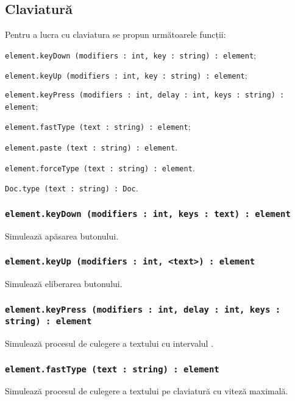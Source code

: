 \subsection{Claviatură}

Pentru a lucra cu claviatura se propun următoarele funcții:
\begin{icItems}
	\item \lstinline|element.keyDown (modifiers : int, key : string) : element|;
	\item \lstinline|element.keyUp (modifiers : int, key : string) : element|;
	\item \lstinline|element.keyPress (modifiers : int, delay : int, keys : string) : element|;
	\item \lstinline|element.fastType (text : string) : element|;
	\item \lstinline|element.paste (text : string) : element|.
	\item \lstinline|element.forceType (text : string) : element|.
	\item \lstinline|Doc.type (text : string) : Doc|.
\end{icItems}

\subsubsection{\lstinline|element.keyDown (modifiers : int, keys : text) : element|}

Simulează apăsarea butonului.

\subsubsection{\lstinline|element.keyUp (modifiers : int, <text>) : element|}

Simulează eliberarea butonului.

\subsubsection{\lstinline|element.keyPress (modifiers : int, delay : int, keys : string) : element|}

Simulează procesul de culegere a textului cu intervalul .

\subsubsection{\lstinline|element.fastType (text : string) : element|}

Simulează procesul de culegere a textului pe claviatură cu viteză maximală.

